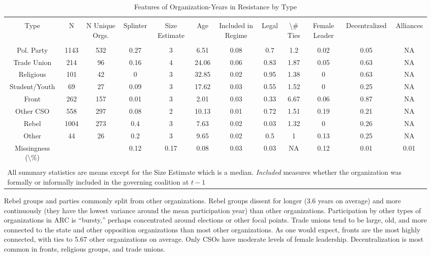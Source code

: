 \begin{landscape}

\begin{table}[!htbp] \centering 
  \caption{Features of Organization-Years in Resistance by Type} 
  \label{Tab: Types} 
\begin{tabular}{@{\extracolsep{5pt}} cccccccccccc} 
\\[-1.8ex]\hline 
\hline \\[-1.8ex] 
Type & N & N Unique Orgs. & Splinter & Size Estimate & Age & Included in Regime & Legal & \textbackslash \# Ties & Female Leader & Decentralized & Alliances \\ 
\hline \\[-1.8ex] 
Pol. Party & 1143 & 532 & 0.27 & 3 & 6.51 & 0.08 & 0.7 & 1.2 & 0.02 & 0.05 & NA \\ 
Trade Union & 214 & 96 & 0.16 & 4 & 24.06 & 0.06 & 0.83 & 1.87 & 0.05 & 0.63 & NA \\ 
Religious & 101 & 42 & 0 & 3 & 32.85 & 0.02 & 0.95 & 1.38 & 0 & 0.63 & NA \\ 
Student/Youth & 69 & 27 & 0.09 & 3 & 17.62 & 0.03 & 0.55 & 1.52 & 0 & 0.25 & NA \\ 
Front & 262 & 157 & 0.01 & 3 & 2.01 & 0.03 & 0.33 & 6.67 & 0.06 & 0.87 & NA \\ 
Other CSO & 558 & 297 & 0.08 & 2 & 10.13 & 0.01 & 0.72 & 1.51 & 0.19 & 0.21 & NA \\ 
Rebel & 1004 & 273 & 0.4 & 3 & 7.63 & 0.02 & 0.03 & 1.32 & 0 & 0.26 & NA \\ 
Other & 44 & 26 & 0.2 & 3 & 9.65 & 0.02 & 0.5 & 1 & 0.13 & 0.25 & NA \\ 
Missingness (\textbackslash \%) &  &  & 0.12 & 0.17 & 0.08 & 0.03 & 0.03 & NA & 0.12 & 0.01 & 0.01 \\ 
\hline \\[-1.8ex] 
\multicolumn{12}{l}{All summary statistics are means except for the Size Estimate which is a median. \textit{Included} measures whether the organization was formally or informally included in the governing coalition at $t-1$} \\ 
\end{tabular} 
\end{table} 


\end{landscape}


Rebel groups and parties commonly split from other organizations. Rebel groups
dissent for longer (3.6 years on average) and more continuously (they have the
lowest variance around the mean participation year) than other organizations.
Participation by other types of organizations in ARC is ``bursty,'' perhaps
concentrated around elections or other focal points. Trade unions tend to be
large, old, and more connected to the state and other opposition organizations
than most other organizations. As one would expect, fronts are the most highly
connected, with ties to 5.67 other organizations on average. Only CSOs have
moderate levels of female leadership. Decentralization is most common in fronts,
religious groups, and trade unions.

